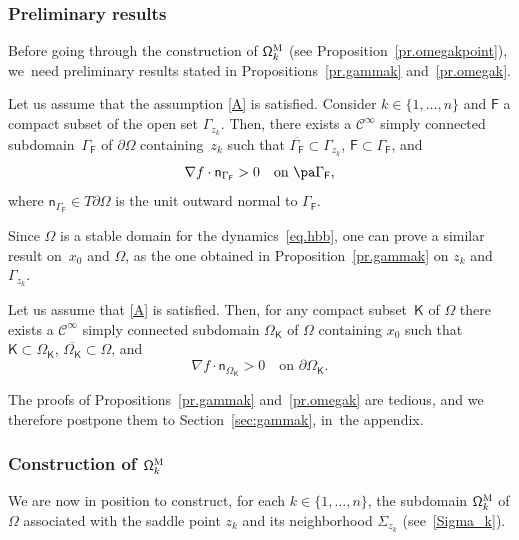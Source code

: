 \subsubsection{Preliminary results}
Before going through the construction of $\mathsf \Omega_k^{\textsc{M}}$ (see Proposition~\ref{pr.omegakpoint}), we~need preliminary results stated in Propositions~\ref{pr.gammak} and~\ref{pr.omegak}.

\begin{proposition}\label{pr.gammak}
Let us assume that the assumption \ref{A} is satisfied. Consider $k\in \{1,\ldots,n\}$ and $\mathsf F$ a compact subset of the open set $\Gamma_{z_k}$. Then, there exists a $\mathcal C^\infty$ simply connected subdomain~$\Gamma_{\mathsf F}$ of $\partial \Omega$ containing~$z_k$ such that $ \overline {\Gamma_{\mathsf F}} \subset \Gamma_{z_k}$, ${\mathsf F}\subset \Gamma_{\mathsf F}$, and
\begin{equation}\label{eq.ultrastable}
\nabla f\cdot \mathsf n_{ \Gamma_{\mathsf F} }>0 \quad\text{on } \pa \Gamma_{\mathsf F},
\end{equation}
where $\mathsf n_{ \Gamma_{\mathsf F}}\in T\partial \Omega$ is the
unit outward normal to $ \Gamma_{\mathsf F}$.
\end{proposition}
Since $\Omega$ is a stable domain for the dynamics~\eqref{eq.hbb},
one can prove a similar result on~$x_0$ and $\Omega$, as the one
obtained in Proposition~\ref{pr.gammak} on $z_k$ and $\Gamma_{z_k}$.

\begin{proposition}\label{pr.omegak}
Let us assume that \ref{A} is satisfied. Then, for any compact subset~$\mathsf K$ of $\Omega$ there exists a $\mathcal C^\infty $ simply connected subdomain $\Omega_{\mathsf K}$ of $\Omega$ containing $x_0$ such that $\mathsf K\subset \Omega_{\mathsf K}$, $\overline{\Omega_{\mathsf K}}\subset \Omega$, and
\[
\nabla f\cdot \mathsf n_{ \Omega_{\mathsf K}}> 0 \quad\text{on } \partial \Omega_{\mathsf K}.
\]
\end{proposition}

The proofs of Propositions~\ref{pr.gammak} and~\ref{pr.omegak} are
tedious, and we therefore postpone them to Section~\ref{sec:gammak}, in~the appendix.

\subsubsection{Construction of $\mathsf \Omega_k^{\textsc{M}}$}
We are now in position to construct, for each $k\in \{1,\ldots,n\}$,
the subdomain $\mathsf \Omega_k^{\textsc{M}}$ of $\Omega$ associated
with the saddle point $z_k$ and its neighborhood $\Sigma_{z_k}$ (see~\eqref{Sigma_k}).

